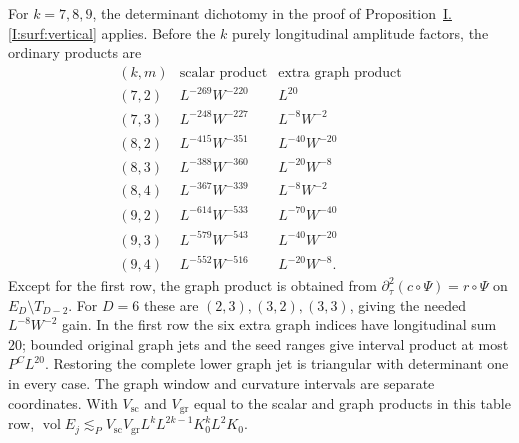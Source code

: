 \documentclass[11pt]{amsart}
\theoremstyle{definition}
\theoremstyle{remark}
\numberwithin{equation}{section}
\newcommand{\partIref}[1]{\hyperref[I:#1]{I.\ref*{I:#1}}}
\begin{document}
For $k=7,8,9$, the determinant dichotomy in the proof of Proposition~\partIref{surf:vertical} applies. Before the $k$ purely longitudinal amplitude factors, the ordinary products are
\[
\begin{array}{c|c|c}
(k,m)&\text{scalar product}&\text{extra graph product}\\\hline
(7,2)&L^{-269}W^{-220}&L^{20}\\
(7,3)&L^{-248}W^{-227}&L^{-8}W^{-2}\\
(8,2)&L^{-415}W^{-351}&L^{-40}W^{-20}\\
(8,3)&L^{-388}W^{-360}&L^{-20}W^{-8}\\
(8,4)&L^{-367}W^{-339}&L^{-8}W^{-2}\\
(9,2)&L^{-614}W^{-533}&L^{-70}W^{-40}\\
(9,3)&L^{-579}W^{-543}&L^{-40}W^{-20}\\
(9,4)&L^{-552}W^{-516}&L^{-20}W^{-8}.
\end{array}
\]
Except for the first row, the graph product is obtained from $\partial_\tau^2(c\circ\Psi)=r\circ\Psi$ on $E_D\setminus T_{D-2}$. For $D=6$ these are $(2,3),(3,2),(3,3)$, giving the needed $L^{-8}W^{-2}$ gain. In the first row the six extra graph indices have longitudinal sum $20$; bounded original graph jets and the seed ranges give interval product at most $P^CL^{20}$. Restoring the complete lower graph jet is triangular with determinant one in every case. The graph window and curvature intervals are separate coordinates. With $V_{\mathrm{sc}}$ and $V_{\mathrm{gr}}$ equal to the scalar and graph products in this table row, $\operatorname{vol}E_j\lesssim_P V_{\mathrm{sc}}V_{\mathrm{gr}}L^kL^{2k-1}K_0^kL^2K_0$.
\end{document}
